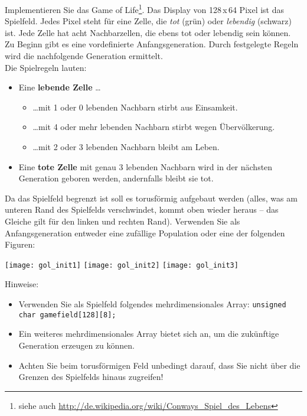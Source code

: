 \documentclass[
  accentcolor=tud1c,	%
  colorbacktitle,		%
  inverttitle,			%
  german,				%
  twoside
]{tudexercise}
\begin{document}
Implementieren Sie das \glqq{}Game of Life\grqq{}\footnote{siehe auch \url{http://de.wikipedia.org/wiki/Conways_Spiel_des_Lebens}}. Das Display von 128\,x\,64 Pixel ist das Spielfeld. Jedes Pixel steht für eine Zelle, die \textit{tot} (grün) oder \textit{lebendig} (schwarz) ist. Jede Zelle hat acht Nachbarzellen, die ebens tot oder lebendig sein können. Zu Beginn gibt es eine vordefinierte Anfangsgeneration. Durch festgelegte Regeln wird die nachfolgende Generation ermittelt.\\
Die Spielregeln lauten:
\begin{itemize}
\item Eine \textbf{lebende Zelle} \dots
\begin{itemize}
\item \dots mit 1 oder 0 lebenden Nachbarn stirbt aus Einsamkeit.
\item \dots mit 4 oder mehr lebenden Nachbarn stirbt wegen Übervölkerung.
\item \dots mit 2 oder 3 lebenden Nachbarn bleibt am Leben.
\end{itemize}
\item Eine \textbf{tote Zelle} mit genau 3 lebenden Nachbarn wird in der nächsten Generation geboren werden, andernfalls bleibt sie tot.
\end{itemize}
Da das Spielfeld begrenzt ist soll es torusförmig aufgebaut werden (alles, was am unteren Rand des Spielfelds verschwindet, kommt oben wieder heraus -- das Gleiche gilt für den linken und rechten Rand). Verwenden Sie als Anfangsgeneration entweder eine zufällige Population oder eine der folgenden Figuren:
\begin{center}
\texttt{[image: gol\_init1]}
\hspace{5mm}
\texttt{[image: gol\_init2]}
\hspace{5mm}
\texttt{[image: gol\_init3]}
\end{center}
Hinweise:
\begin{itemize}
\item Verwenden Sie als Spielfeld folgendes mehrdimensionales Array:
\texttt{unsigned char gamefield[128][8];}
\item Ein weiteres mehrdimensionales Array bietet sich an, um die zukünftige Generation erzeugen zu können.
\item Achten Sie beim torusförmigen Feld unbedingt darauf, dass Sie nicht über die Grenzen des Spielfelds hinaus zugreifen!
\end{itemize}
\end{document}
